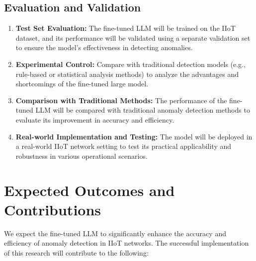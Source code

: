 \documentclass[12pt]{article}
\begin{document}
\subsection{Evaluation and Validation}
\begin{enumerate}[label=\arabic*.]
  \item \textbf{Test Set Evaluation:} The fine-tuned LLM will be trained on the IIoT dataset, and its performance will be validated using a separate validation set to ensure the model's effectiveness in detecting anomalies.
  
  \item \textbf{Experimental Control:} Compare with traditional detection models (e.g., rule-based or statistical analysis methods) to analyze the advantages and shortcomings of the fine-tuned large model.
  
  \item \textbf{Comparison with Traditional Methods:} The performance of the fine-tuned LLM will be compared with traditional anomaly detection methods to evaluate its improvement in accuracy and efficiency.

  \item \textbf{Real-world Implementation and Testing:} The model will be deployed in a real-world IIoT network setting to test its practical applicability and robustness in various operational scenarios.
\end{enumerate}

\section{Expected Outcomes and Contributions}
\label{sec:outcomes}

  We expect the fine-tuned LLM to significantly enhance the accuracy and efficiency of anomaly detection in IIoT networks. The successful implementation of this research will contribute to the following:
\end{document}
